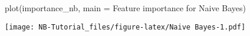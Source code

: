\documentclass[
]{article}
\newenvironment{Shaded}{\begin{snugshade}}{\end{snugshade}}
\newcommand{\AttributeTok}[1]{\textcolor[rgb]{0.77,0.63,0.00}{#1}}
\newcommand{\FunctionTok}[1]{\textcolor[rgb]{0.00,0.00,0.00}{#1}}
\newcommand{\NormalTok}[1]{#1}
\newcommand{\StringTok}[1]{\textcolor[rgb]{0.31,0.60,0.02}{#1}}
\begin{document}
\begin{Shaded}
\begin{Highlighting}[]
\FunctionTok{plot}\NormalTok{(importance\_nb, }\AttributeTok{main =} \StringTok{\textquotesingle{}Feature importance for Naive Bayes\textquotesingle{}}\NormalTok{)}
\end{Highlighting}
\end{Shaded}

\texttt{[image: NB-Tutorial\_files/figure-latex/Naive Bayes-1.pdf]}
\end{document}
